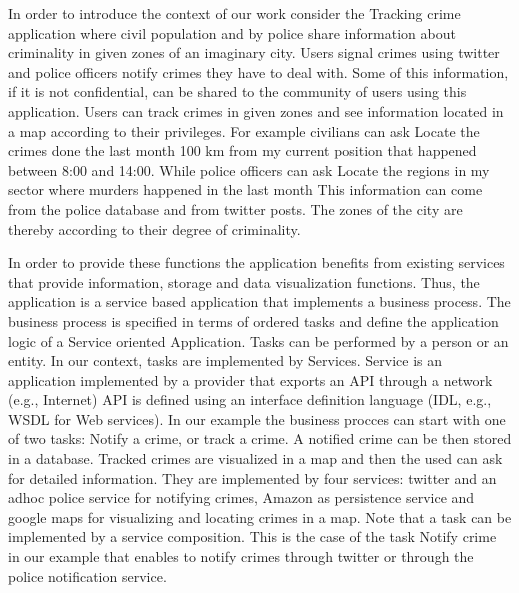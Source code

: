 
In order to introduce the context of our work consider the Tracking crime application where civil population and by police share information about criminality in given zones of an imaginary city. 
Users signal crimes using twitter and police officers notify crimes  they have to deal with. 
Some of this information, if it is not confidential, can be shared to the community of users using this application. 
Users can track crimes in given zones and see information located in a map according to their privileges.  
For example civilians can ask Locate the crimes done the last month 100 km from my current position that happened between 8:00 and 14:00.
While police officers can ask Locate the regions in my sector where murders happened in the last month
This information can come from the police database and from twitter posts. 
The zones of the city are thereby according to their degree of criminality.

 In order to provide these functions the application benefits from existing services that provide information,  storage and data visualization functions. Thus, the application is a service based application that implements a business process.
 The business process is specified in terms of ordered tasks and define the application logic of a Service oriented Application. Tasks can be performed by a person or an entity. In our context, tasks are implemented by Services. 
Service is an application implemented by a provider that exports an API through a network (e.g., Internet)
API is defined using an interface definition language (IDL, e.g., WSDL for Web services).
 In our example the business procces can start with one of two tasks: Notify a crime, or track a crime. A notified crime can be then stored in a database. Tracked crimes are visualized in a map and then the used can ask for detailed information. They are implemented by four services: twitter and an adhoc police service for notifying crimes, Amazon as persistence service and google maps for visualizing and locating crimes in a map. 
Note that a task can be implemented by a service composition. This is the case of the task Notify crime in our example that enables to notify crimes through twitter or through the police notification service. 
 

